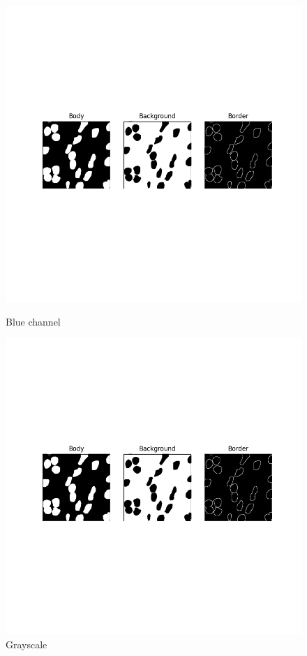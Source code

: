 \documentclass[target=bach,aauheader=,style=]{thud}
\begin{document}
\begin{figure}[ht]
\vspace{0.5cm}

\begin{minipage}{0.45\textwidth}
    \centering
    \includegraphics[width=\linewidth]{imgs/3ch_binarymask.png}
    \caption*{Blue channel}
\end{minipage}
\hspace{0.5cm}
\begin{minipage}{0.45\textwidth}
    \centering
    \includegraphics[width=\linewidth]{imgs/3ch_binarymask.png}
    \caption*{Grayscale}
\end{minipage}


\end{figure}
\end{document}

